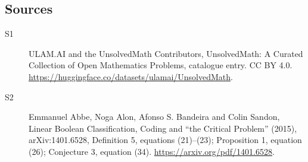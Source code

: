 \documentclass[11pt]{article}
\begin{document}
\subsection{Sources}
\begin{description}
\item[\hypertarget{source:statement:1}{S1}] ULAM.AI and the UnsolvedMath Contributors, UnsolvedMath: A Curated Collection of Open Mathematics Problems, catalogue entry. CC BY 4.0. \url{https://huggingface.co/datasets/ulamai/UnsolvedMath}.
\item[\hypertarget{source:statement:2}{S2}] Emmanuel Abbe, Noga Alon, Afonso S. Bandeira and Colin Sandon, Linear Boolean Classification, Coding and “the Critical Problem” (2015), arXiv:1401.6528, Definition 5, equations (21)–(23); Proposition 1, equation (26); Conjecture 3, equation (34). \url{https://arxiv.org/pdf/1401.6528}.
\end{description}
\label{end:statement}
\end{document}
